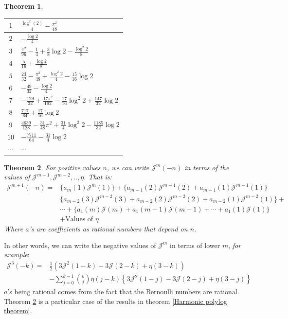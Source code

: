 \documentclass{article}
\newtheorem{theorem}{Theorem}
\begin{document}
\begin{theorem}
\begin{table}[h]
\begin{tabular}{|c|l|}
     $1$ & $ \frac{\log^2(2)}{4}-\frac{\pi^2}{48}$ \\ \hline  
     $2$ &  $-\frac{\log 2}{4}$ \\ \hline   
     $3$ & $\frac{\pi^2}{96}-\frac{1}{4}+\frac{3}{8}\log 2-\frac{\log^2 2}{8}$ \\ \hline  
     $4$ & $\frac{5}{16}+\frac{\log 2}{8} $ \\ \hline   
     $5$ & $\frac{23}{32}-\frac{\pi^2}{48}+\frac{\log^2 2}{4}-\frac{15}{16}\log 2$ \\ \hline  
     $6$ & $-\frac{49}{32}-\frac{\log2}{4}$  \\ \hline  
     $7$ & $-\frac{129}{32}+\frac{17 \pi^2}{192}-\frac{17}{16}\log^2 2+\frac{147}{32}\log 2$ \\ \hline  
     $8$ & $\frac{717}{64}+\frac{17}{16}\log 2 $ \\ \hline  
     $9$ & $\frac{4639}{128}-\frac{31}{48}\pi^2+\frac{31}{4}\log^2 2-\frac{1185}{32}\log 2$ \\ \hline  
     $10$& $-\frac{7711}{64}-\frac{31}{4}\log 2$ \\ \hline  
     $\cdots$ & $\cdots$
 \\ \hline\end{tabular}
    \end{table}
    
\end{theorem}
\begin{theorem}\label{negative values of Jm}
\textit{For positive values $n$, we can write $\mathcal{J}^m(-n)$ in terms of the values of $\mathcal{J}^{m-1},\mathcal{J}^{m-2},..,\eta$}. That is: \begin{equation}
    \begin{split}
        \mathcal{J}^{m+1}(-n)=& \{a_m(1)\mathcal{J}^m(1)\}+ \{a_{m-1}(2)\mathcal{J}^{m-1}(2)+a_{m-1}(1)\mathcal{J}^{m-1}(1)\}\\
         & \{a_{m-2}(3)\mathcal{J}^{m-2}(3)+a_{m-2}(2)\mathcal{J}^{m-2}(2)+a_{m-2}(1)\mathcal{J}^{m-2}(1)\}+\\ &\cdots+\{a_1(m)\mathcal{J}(m)+a_1(m-1)\mathcal{J}(m-1)+\cdots+a_1(1)\mathcal{J}(1)\}\\ &+\text{Values of }\eta
    \end{split}
\end{equation}
Where $a$'s are coefficients as rational numbers that depend on $n$. \end{theorem} 
In other words, we can write the negative values of $\mathcal{J}^m$ in terms of lower $m$, \textit{for example}:
\begin{equation}\label{Negative values of J3}\begin{split}
    \mathcal{J}^3(-k)=& \frac{1}{2}\left(3\mathcal{J}^2(1-k)-3\mathcal{J}(2-k)+\eta(3-k)\right)\\ &-\sum_{j=0}^{k-1}\binom{k}{j}\eta(j-k)\left\{3\mathcal{J}^2(1-j)-3\mathcal{J}(2-j)+\eta(3-j)\right\}\end{split}
\end{equation}
$a$'s being rational comes from the fact that the Bernoulli numbers are rational. Theorem \ref{negative values of Jm} is a particular case of the results in theorem \ref{Harmonic polylog theorem}.
\end{document}
